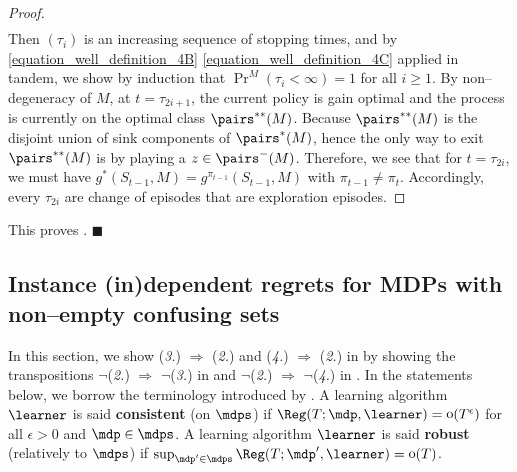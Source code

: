 \documentclass[preprint,cleveref,12pt]{colt2025}
\DeclareMathOperator*{\oh}{\mathrm{o}}
\def\model{\mdp}
\def\models{\mdps}
\def\QED{$\blacksquare$}
\newcommand{\strong}[1]{\textbf{#1}}
\begin{document}
\begin{proof}
\begin{align*}
{            }
        \end{align*}
        Then $(\tau_i)$ is an increasing sequence of stopping times, and by \eqref{equation_well_definition_4B} \eqref{equation_well_definition_4C} applied in tandem, we show by induction that $\Pr^M(\tau_i < \infty) = 1$ for all $i \ge 1$.
        By non--degeneracy of $M$, at $t = \tau_{2i+1}$, the current policy is gain optimal and the process is currently on the optimal class $\pairs^{**}(M)$.
        Because $\pairs^{**}(M)$ is the disjoint union of sink components of $\pairs^*(M)$, hence the only way to exit $\pairs^{**}(M)$ is by playing a $z \in \pairs^-(M)$.
        Therefore, we see that for $t = \tau_{2i}$, we must have $g^*(S_{t-1}, M) = g^{\pi_{t-1}}(S_{t-1}, M)$ with $\pi_{t-1} \ne \pi_t$. 
        Accordingly, every $\tau_{2i}$ are change of episodes that are exploration episodes.
    \end{proof}

    This proves . 
    \hfill
    \QED

    \subsection{Instance (in)dependent regrets for MDPs with non--empty confusing sets}
    \label{appendix_confusing_implies_regret}

    In this section, we show (\textit{3.}) $\Rightarrow$ (\textit{2.}) and (\textit{4.}) $\Rightarrow$ (\textit{2.}) in  by showing the transpositions $\neg$(\textit{2.}) $\Rightarrow$ $\neg$(\textit{3.}) in  and $\neg$(\textit{2.}) $\Rightarrow$ $\neg$(\textit{4.}) in .
    In the statements below, we borrow the terminology introduced by .
    A learning algorithm $\learner$ is said \strong{consistent} (on $\models$) if $\Reg(T; \model, \learner) = \oh(T^\epsilon)$ for all $\epsilon > 0$ and $\model \in \models$.
    A learning algorithm $\learner$ is said \strong{robust} (relatively to $\models$) if $\sup_{\model' \in \models} \Reg(T; \model', \learner) = \oh(T)$. 
\end{document}
